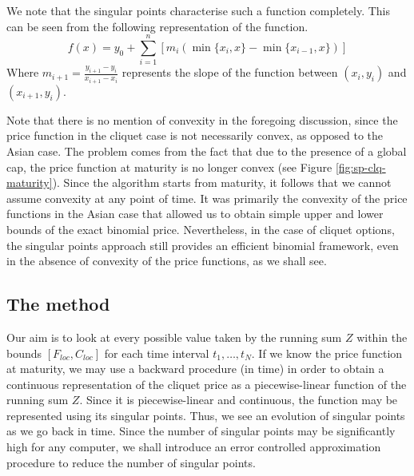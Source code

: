 \begin{rem} \label{rem:sp-asian-characterisation}
	We note that the singular points characterise such a function completely. This can be seen from the following representation of the function.
	\begin{equation}
		\label{eq:sp-asian-function-repr}
		f(x) = y_0 + \sum_{i=1}^n [ m_i ( \min \{x_{i}, x \} - \min \{ x_{i-1}, x \} ) ]
	\end{equation}
	Where $ m_{i+1} = \frac{y_{i+1} - y_{i}}{x_{i+1} - x_{i}} $ represents the slope of the function between $ (x_{i}, y_{i}) $ and $ (x_{i+1}, y_{i}) $.
\end{rem}

\begin{rem}
	Note that there is no mention of convexity in the foregoing discussion, since the price function in the cliquet case is not necessarily convex, as opposed to the Asian case. The problem comes from the fact that due to the presence of a global cap, the price function at maturity is no longer convex (see Figure \ref{fig:sp-clq-maturity}). Since the algorithm starts from maturity, it follows that we cannot assume convexity at any point of time. It was primarily the convexity of the price functions in the Asian case that allowed us to obtain simple upper and lower bounds of the exact binomial price. Nevertheless, in the case of cliquet options, the singular points approach still provides an efficient binomial framework, even in the absence of convexity of the price functions, as we shall see.
\end{rem}



\subsection{The method}
\label{subsec:sp-clq-method}

Our aim is to look at every possible value taken by the running sum $Z$ within the bounds $ [ F_{loc}, C_{loc} ] $ for each time interval $ t_1, \dots, t_{N} $. If we know the price function at maturity, we may use a backward procedure (in time) in order to obtain a continuous representation of the cliquet price as a piecewise-linear function of the running sum $Z$. Since it is piecewise-linear and continuous, the function may be represented using its singular points. Thus, we see an evolution of singular points as we go back in time. Since the number of singular points may be significantly high for any computer, we shall introduce an error controlled approximation procedure to reduce the number of singular points.

